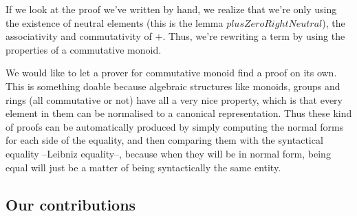 If we look at the proof we've written by hand, we realize that we're only using the existence of neutral elements (this is the lemma $plusZeroRightNeutral$), the associativity and commutativity of $+$. Thus, we're rewriting a term by using the properties of a commutative monoid.

We would like to let a prover for commutative monoid find a proof on its own. This is something doable because algebraic structures like monoids, groups and rings (all commutative or not) have all a very nice property, which is that every element in them can be normalised to a canonical representation. Thus these kind of proofs can be automatically produced by simply computing the normal forms for each side of the equality, and then comparing them with the syntactical equality --Leibniz equality--, because when they will be in normal form, being equal will just be a matter of being syntactically the same entity.

\subsection{Our contributions}

